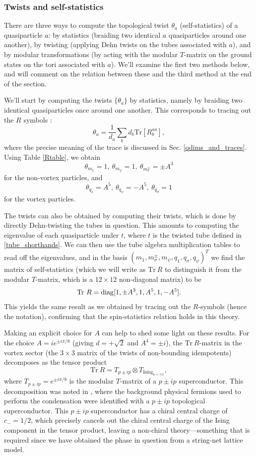 \documentclass[12pt,a4paper]{article}
\newcommand{\tp}{\otimes}
\newcommand{\unit}{\mathds{1}}
\newcommand\be            {\begin{equation}}
\newcommand\ee            {\end{equation}}
\newcommand{\Tr}{\text{Tr}}
\begin{document}
\subsubsection{Twists and self-statistics}

There are three ways to compute the topological twist $\theta_a$ (self-statistics) of a quasiparticle $a$: by statistics (braiding two identical $a$ quasiparticles around one another), by twisting (applying Dehn twists on the tubes associated with $a$), and by modular transformations (by acting with the modular $T$-matrix on the ground states on the tori associated with $a$). 
We'll examine the first two methods below, and will comment on the relation between these and the third method at the end of the section. 

We'll start by computing the twists $\{\theta_a\}$ by statistics, namely by braiding two identical quasiparticles once around one another. 
This corresponds to tracing out the $R$ symbols \cite{barkeshli2014}:
\be \label{Tmattr} \theta_a = \frac{1}{d_a}\sum_b d_b \text{Tr}[R^{aa}_b],\ee
where the precise meaning of the trace is discussed in Sec. \ref{qdims_and_traces}.
Using Table \ref{Rtable}, we obtain
\be \theta_{m_\unit} = 1,\ \theta_{m_\psi} = 1,\ \theta_{m^\pm_\sigma} = \pm A^3\ee
for the non-vortex particles, and 
\be \theta_{q_\unit} = A^5,\ \theta_{q_\psi} = -A^5,\ \theta_{q_\sigma} = 1\ee
for the vortex particles. 

The twists can also be obtained by computing their twists, which is done by directly Dehn-twisting the tubes in question. 
This amounts to computing the eigenvalue of each quasiparticle under $t$, where $t$ is the twisted tube defined in \eqref{tube_shorthands}.
We can then use the tube algebra multiplication tables to read off the eigenvalues, and in the basis $(m_\unit,m^\pm_\sigma,m_\psi,q_\unit,q_\sigma,q_\psi)^T$ we find the matrix of self-statistics (which we will write as $\Tr\ R$ to distinguish it from the modular $T$-matrix, which is a $12\times 12$ non-diagonal matrix) to be
\be \Tr\ R = {\rm diag}[1,\pm A^3,1,A^{5},1,-A^{5}].\ee
This yields the same result as we obtained by tracing out the $R$-symbols (hence the notation), confirming that the spin-statistics relation holds in this theory.

Making an explicit choice for $A$ can help to shed some light on these results. For the choice $A = ie^{\pm i \pi/8}$ (giving $d=+\sqrt{2}$ and $A^4 = \pm i$), the $\Tr\ R$-matrix in the vortex sector (the $3\times3$ matrix of the twists of non-bounding idempotents) decomposes as the tensor product
\be \Tr\ R = T_{p\pm ip} \tp T_{\text{Ising}_{\nu =\mp1}},\ee
where $T_{p\pm ip} = e^{\pm i\pi/8}$ is the modular $T$-matrix of a $p\pm ip$ superconductor. 
This decomposition was noted in \cite{ware2016}, where the background physical fermions used to perform the condensation 
were identified with a $p\pm ip$ topological superconductor. 
This $p\pm ip$ superconductor has a chiral central charge of $c_-=1/2$, which precisely cancels 
out the chiral central charge of the Ising component in the tensor product, leaving a non-chiral theory---something
that is required since we have obtained the phase in question from a string-net lattice model. 
\end{document}
